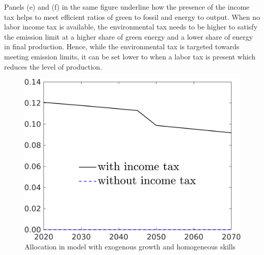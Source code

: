 Panels (e) and (f) in the same figure underline how the presence of the income tax helps to meet efficient ratios of green to fossil and energy to output. When no labor income tax is available, the environmental tax needs to be higher to satisfy the emission limit at a higher share of green energy and a lower share of energy in final production. Hence, while the environmental tax is targeted towards meeting emission limits, it can be set lower to when a labor tax is present which reduces the level of production.  
\begin{figure}[h!!]
	\centering
	\caption{Allocation in model with exogenous growth and homogeneous skills  }\label{fig:optAll_EFF_nskxgr}
	\begin{minipage}[]{0.32\textwidth}
		\includegraphics[width=1\textwidth]{../../codding_model/own_basedOnFried/optimalPol_190722_tidiedUp/figures/all_10Aout22/comp_benchregime3_notaul2_OPT_T_NoTaus_taul_spillover0_noskill1_sep1_xgrowth1_PV1_etaa0.79_lgd1.png}
	\end{minipage}
	\begin{minipage}[]{0.32\textwidth}

\end{minipage}
\end{figure}
